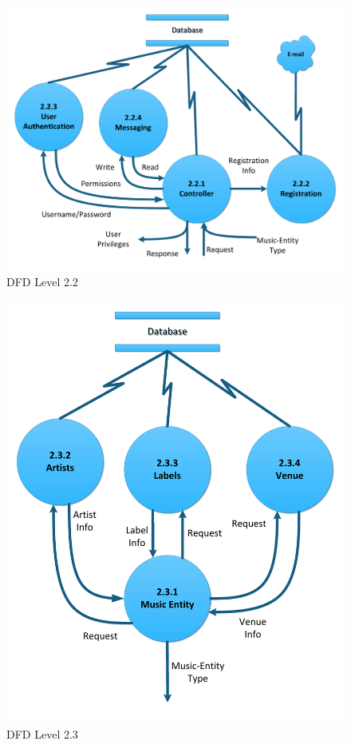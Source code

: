 \documentclass[letterpaper,12pt]{article}
\begin{document}
{\eject

\begin{figure}[h]
\centering
\includegraphics[scale=0.6]{DFD_level_2_2.pdf}
\caption{DFD Level 2.2}
\label{fig:DFD_level_2.2}
\end{figure}

\eject

\begin{figure}[h]
\centering
\includegraphics[scale=0.6]{DFD_level_2_3.pdf}
\caption{DFD Level 2.3}
\label{fig:DFD_level_2.3}
\end{figure}

}
\end{document}
